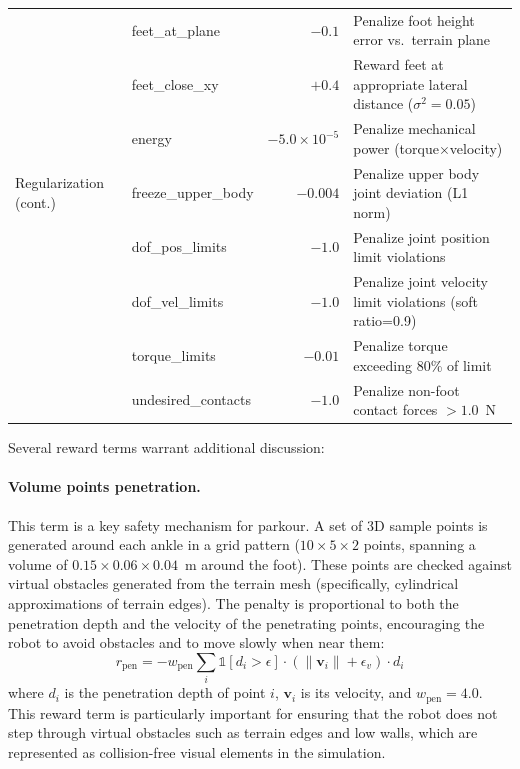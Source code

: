 \begin{table}[t]
\begin{tabular}{@{}lp{3.2cm}rp{7cm}@{}}
\midrule
\multirow{7}{*}{Regularization (cont.)} & feet\_at\_plane & $-0.1$ & Penalize foot height error vs.\ terrain plane \\
 & feet\_close\_xy & $+0.4$ & Reward feet at appropriate lateral distance ($\sigma^2=0.05$) \\
 & energy & $-5.0 \times 10^{-5}$ & Penalize mechanical power (torque$\times$velocity) \\
 & freeze\_upper\_body & $-0.004$ & Penalize upper body joint deviation (L1 norm) \\
\midrule
\multirow{4}{*}{Safety} & dof\_pos\_limits & $-1.0$ & Penalize joint position limit violations \\
 & dof\_vel\_limits & $-1.0$ & Penalize joint velocity limit violations (soft ratio=0.9) \\
 & torque\_limits & $-0.01$ & Penalize torque exceeding 80\% of limit \\
 & undesired\_contacts & $-1.0$ & Penalize non-foot contact forces $>1.0$~N \\
\bottomrule
\end{tabular}
\end{table}

Several reward terms warrant additional discussion:

\paragraph{Volume points penetration.}
This term is a key safety mechanism for parkour. A set of 3D sample points is generated around each ankle in a grid pattern ($10 \times 5 \times 2$ points, spanning a volume of $0.15 \times 0.06 \times 0.04$~m around the foot). These points are checked against virtual obstacles generated from the terrain mesh (specifically, cylindrical approximations of terrain edges). The penalty is proportional to both the penetration depth and the velocity of the penetrating points, encouraging the robot to avoid obstacles and to move slowly when near them:
\begin{equation}
    r_{\text{pen}} = -w_{\text{pen}} \sum_{i} \mathbb{1}[d_i > \epsilon] \cdot (\|\mathbf{v}_i\| + \epsilon_v) \cdot d_i
\end{equation}
where $d_i$ is the penetration depth of point $i$, $\mathbf{v}_i$ is its velocity, and $w_{\text{pen}} = 4.0$. This reward term is particularly important for ensuring that the robot does not step through virtual obstacles such as terrain edges and low walls, which are represented as collision-free visual elements in the simulation.

